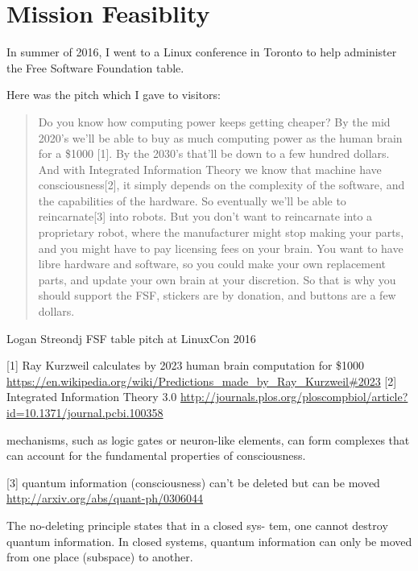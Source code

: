 \chapter{Mission Feasiblity}
\label{feasible}
In summer of 2016, I went to a Linux conference in Toronto to help administer
the Free Software Foundation table. 

Here was the pitch which I gave to visitors:

\blockquote{Do you know how computing power keeps getting cheaper?
By the mid 2020’s  we’ll be able to buy as much computing power as the human 
brain for a \$1000 [1].
By the 2030’s that’ll be down to a few hundred dollars.
And with Integrated Information Theory  we know that machine have 
consciousness[2], it simply depends on the complexity of the software, and the capabilities of the hardware.
So eventually we’ll be able to reincarnate[3] into robots.
But you don’t want to reincarnate into a proprietary robot, where the manufacturer might stop making your parts, and you might have to pay licensing fees on your brain.
You want to have libre hardware and software, so you could make your own replacement parts, and update your own brain at your discretion.
So that is why you should support the FSF, stickers are by donation, and buttons
are a few dollars.}{Logan Streondj FSF table pitch at LinuxCon 2016}

[1] Ray Kurzweil calculates by 2023 human brain computation for \$1000
\url{https://en.wikipedia.org/wiki/Predictions_made_by_Ray_Kurzweil#2023}
[2] Integrated Information Theory 3.0
\url{http://journals.plos.org/ploscompbiol/article?id=10.1371/journal.pcbi.100358}

    mechanisms, such as logic gates or neuron-like elements, can form complexes that can account for the fundamental properties of consciousness.

[3] quantum information (consciousness) can’t be deleted but can be moved
\url{http://arxiv.org/abs/quant-ph/0306044}

    The no-deleting principle states that in a closed sys-
    tem, one cannot destroy quantum information. In closed
    systems, quantum information can only be moved from
    one place (subspace) to another.

